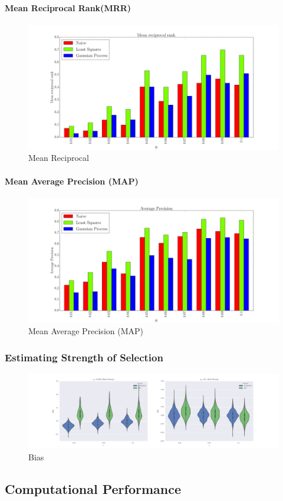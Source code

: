 \paragraph{Mean Reciprocal Rank(MRR)}
\begin{figure}[H]
  \centering
    \includegraphics[width=\textwidth]{mrr}
  \caption{Mean Reciprocal}
  \label{fig:Fig2}
\end{figure}


\paragraph{Mean Average Precision (MAP)}
\begin{figure}[hh]
  \centering
    \includegraphics[width=\textwidth]{ap}
  \caption{Mean Average Precision (MAP)}
  \label{fig:Fig5}
\end{figure}


\subsubsection{Estimating Strength of Selection}
\begin{figure}[H]
  \centering
    \includegraphics[width=\textwidth]{bias}
  \caption{Bias}
  \label{fig:Fig4}
\end{figure}

\subsection{Computational Performance}